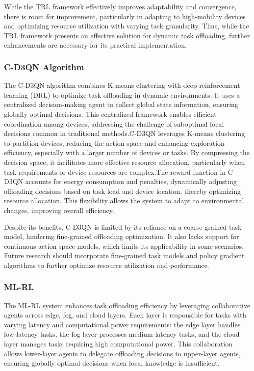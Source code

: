 \documentclass[journal]{IEEEtran}
\begin{document}
While the TRL framework effectively improves adaptability and convergence, there is room for improvement, particularly in adapting to high-mobility devices and optimizing resource utilization with varying task granularity. Thus, while the TRL framework presents an effective solution for dynamic task offloading, further enhancements are necessary for its practical implementation.~\cite{zhou02}

\subsubsection{C-D3QN Algorithm}

The C-D3QN algorithm combines K-means clustering with deep reinforcement learning (DRL) to optimize task offloading in dynamic environments. It uses a centralized decision-making agent to collect global state information, ensuring globally optimal decisions. This centralized framework enables efficient coordination among devices, addressing the challenge of suboptimal local decisions common in traditional methods.C-D3QN leverages K-means clustering to partition devices, reducing the action space and enhancing exploration efficiency, especially with a larger number of devices or tasks. By compressing the decision space, it facilitates more effective resource allocation, particularly when task requirements or device resources are complex.The reward function in C-D3QN accounts for energy consumption and penalties, dynamically adjusting offloading decisions based on task load and device location, thereby optimizing resource allocation. This flexibility allows the system to adapt to environmental changes, improving overall efficiency.

Despite its benefits, C-D3QN is limited by its reliance on a coarse-grained task model, hindering fine-grained offloading optimization. It also lacks support for continuous action space models, which limits its applicability in some scenarios. Future research should incorporate fine-grained task models and policy gradient algorithms to further optimize resource utilization and performance.~\cite{zhou03}

\subsubsection{ML-RL}

The ML-RL system enhances task offloading efficiency by leveraging collaborative agents across edge, fog, and cloud layers. Each layer is responsible for tasks with varying latency and computational power requirements: the edge layer handles low-latency tasks, the fog layer processes medium-latency tasks, and the cloud layer manages tasks requiring high computational power. This collaboration allows lower-layer agents to delegate offloading decisions to upper-layer agents, ensuring globally optimal decisions when local knowledge is insufficient.
\end{document}
